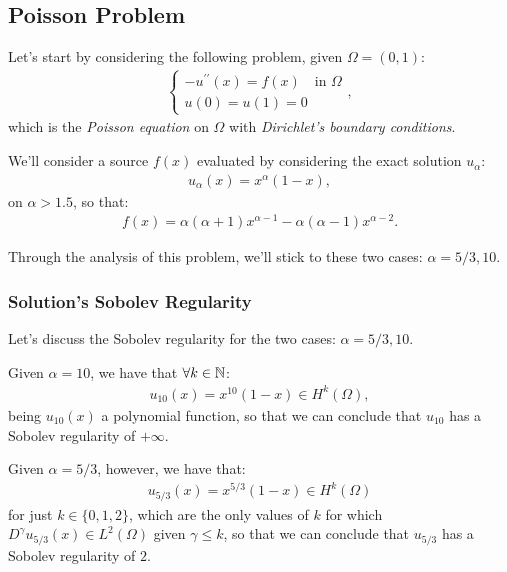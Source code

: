 \subsection{Poisson Problem}

Let's start by considering the following problem, given $\Omega = (0, 1)$:
\begin{gather}
	\begin{cases}
		-u^{\prime \prime}(x) = f(x) \quad \text{in } \Omega \\
		u(0) = u(1) = 0
	\end{cases},
\end{gather}
which is the \textit{Poisson equation} on $\Omega$ with \textit{Dirichlet's boundary conditions}.

We'll consider a source $f(x)$ evaluated by considering the exact solution $u_{\alpha}$:
\begin{gather}
	u_{\alpha}(x) = x^{\alpha} (1 - x),
\end{gather}
on $\alpha > 1.5$, so that:
\begin{gather}
	f(x) = \alpha (\alpha + 1) x^{\alpha - 1} - \alpha (\alpha - 1) x^{\alpha - 2}.
\end{gather}

Through the analysis of this problem, we'll stick to these two cases: $\alpha = 5/3, 10$.

\subsubsection{Solution's Sobolev Regularity} \label{sob_regularity}

Let's discuss the Sobolev regularity for the two cases: $\alpha = 5/3, 10$.

Given $\alpha = 10$, we have that $\forall k \in \mathbb{N}$:
\begin{gather}
	u_{10}(x) = x^{10} (1 - x) \in H^{k}(\Omega),
\end{gather}
being $u_{10}(x)$ a polynomial function, so that we can conclude that $u_{10}$ has a Sobolev regularity of $+\infty$.

Given $\alpha = 5/3$, however, we have that:
\begin{gather}
	u_{5/3}(x) = x^{5/3} (1 - x) \in H^{k}(\Omega)
\end{gather}
for just $k \in \{0, 1, 2\}$, which are the only values of $k$ for which $D^{\gamma} u_{5/3}(x) \in L^2(\Omega)$ given $\gamma \le k$, so that we can conclude that $u_{5/3}$ has a Sobolev regularity of $2$.


